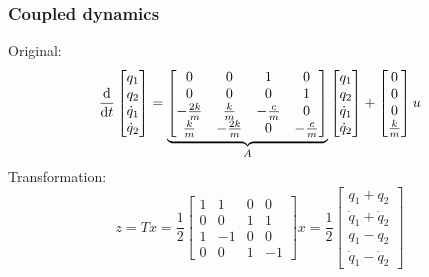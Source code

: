 \documentclass[10pt]{beamer-control}
\begin{document}
\begin{frame}
  \frametitle{Coupled dynamics}

  Original:
  \begin{equation}
    \frac{\mathrm{d} }{\mathrm{d} t}\begin{bmatrix}q_1\\q_2\\\dot q_1\\\dot q_2\end{bmatrix} =
    \underbrace{\begin{bmatrix}
        0 & 0 & 1 & 0 \\
        0 & 0 & 0 & 1 \\
        -\frac{2k}{m} & \frac{k}{m} & -\frac{c}{m} & 0 \\
        \frac{k}{m} & -\frac{2k}{m} & 0 & -\frac{c}{m}
      \end{bmatrix}}_{A}
    \begin{bmatrix}q_1\\q_2\\\dot q_1\\\dot q_2\end{bmatrix} +
    \begin{bmatrix}
      0 \\
      0 \\
      0 \\
      \frac{k}{m}
    \end{bmatrix}
    u
  \end{equation}
  Transformation:
  \begin{equation}
    z = T x = \frac{1}{2}
    \begin{bmatrix}
      1 & 1 & 0 & 0 \\
      0 & 0 & 1 & 1 \\
      1 & -1 & 0 & 0 \\
      0 & 0 & 1 & -1
    \end{bmatrix}
    x
    =
    \frac12
    \begin{bmatrix}
      q_1 + q_2 \\
      \dot{q}_1 + \dot{q}_2 \\
      q_1 - q_2 \\
      \dot{q}_1 - \dot{q}_2
    \end{bmatrix}
  \end{equation}


\end{frame}
\end{document}
